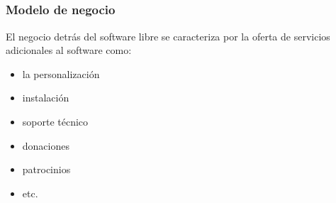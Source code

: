 \subsection{}
\begin{frame}
    \frametitle{Modelo de negocio}
        El negocio detrás del software libre se caracteriza por la oferta de servicios adicionales al software como:\par
        \begin{itemize}
            \item la personalización
            \item instalación
            \item soporte técnico
            \item donaciones
            \item patrocinios
            \item etc.
        \end{itemize}
\end{frame}

